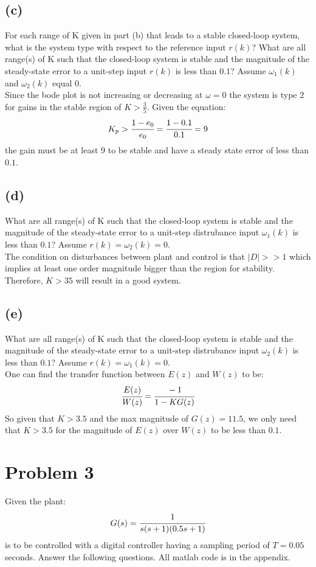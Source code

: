 \documentclass{article}
\begin{document}
\subsection*{(c)}
For each range of K given in part (b) that leads to a stable closed-loop system, what is the system type with respect to the reference input $r(k)$? What are all range(s) of K such that the closed-loop system is stable and the magnitude of the steady-state error to a unit-step input $r(k)$ is less than $0.1$? Assume $\omega_1(k)$ and $\omega_2(k)$ equal 0.\\

Since the bode plot is not increasing or decreasing at $\omega=0$ the system is type 2 for gains in the stable region of $K>\frac{3}{5}$. Given the equation:
\[K_p>\cfrac{1-e_0}{e_0}=\cfrac{1-0.1}{0.1}=9\]
the gain must be at least 9 to be stable and have a steady state error of less than $0.1$.
\subsection*{(d)}
What are all range(s) of K such that the closed-loop system is stable and the magnitude of the steady-state error to a unit-step distrubance input $\omega_1(k)$ is less than $0.1$? Assume $r(k)=\omega_2(k)=0$.\\

The condition on disturbances between plant and control is that $\lvert D\rvert>>1$ which implies at least one order magnitude bigger than the region for stability. Therefore, $K>35$ will result in a good system.

\subsection*{(e)}
What are all range(s) of K such that the closed-loop system is stable and the magnitude of the steady-state error to a unit-step distrubance input $\omega_2(k)$ is less than $0.1$? Assume $r(k)=\omega_1(k)=0$.\\

One can find the transfer function between $E(z)$ and $W(z)$ to be:
\[\cfrac{E(z)}{W(z)}=\cfrac{-1}{1-KG(z)}\]
So given that $K>3.5$ and the max magnitude of $G(z)=11.5$, we only need that $K>3.5$ for the magnitude of $E(z)$ over $W(z)$ to be less than $0.1$.

\section*{Problem 3}
Given the plant:
\[G(s)=\cfrac{1}{s(s+1)(0.5s+1)}\]
is to be controlled with a digital controller having a sampling period of $T=0.05$ seconds. Answer the following questions. All matlab code is in the appendix.
\end{document}
